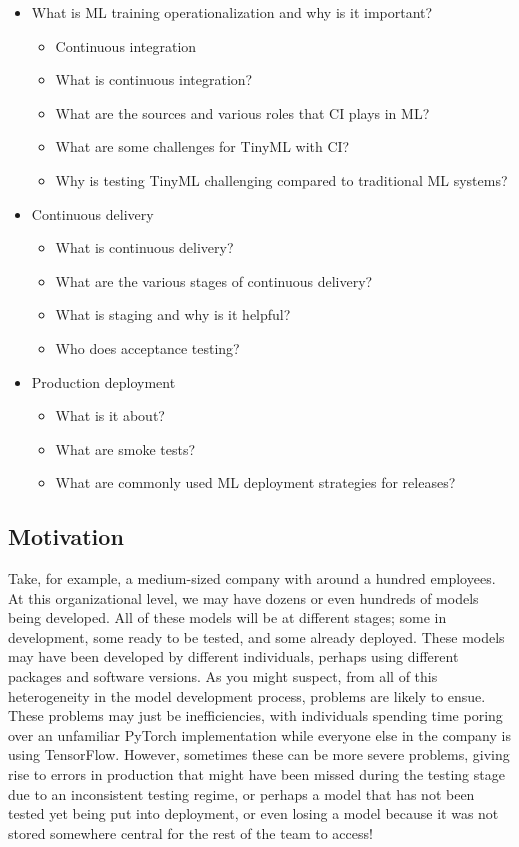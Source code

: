 {{{\begin{itemize}
  \item What is ML training operationalization and why is it important?
    \begin{itemize}
      \item Continuous integration
      \item What is continuous integration?
      \item What are the sources and various roles that CI plays in ML? 
      \item What are some challenges for TinyML with CI?
      \item Why is testing TinyML challenging compared to traditional ML systems?
    \end{itemize}    
  \item Continuous delivery
    \begin{itemize}
      \item What is continuous delivery?
      \item What are the various stages of continuous delivery?
      \item What is staging and why is it helpful?
      \item Who does acceptance testing?
    \end{itemize}    
  \item Production deployment
    \begin{itemize}
      \item What is it about?
      \item What are smoke tests?
      \item What are commonly used ML deployment strategies for releases?
    \end{itemize}    
  \end{itemize}    


\subsection{Motivation}

    Take, for example, a medium-sized company with around a hundred employees. At this organizational level, we may have dozens or even hundreds of models being developed. All of these models will be at different stages; some in development, some ready to be tested, and some already deployed. These models may have been developed by different individuals, perhaps using different packages and software versions. As you might suspect, from all of this heterogeneity in the model development process, problems are likely to ensue. These problems may just be inefficiencies, with individuals spending time poring over an unfamiliar PyTorch implementation while everyone else in the company is using TensorFlow. However, sometimes these can be more severe problems, giving rise to errors in production that might have been missed during the testing stage due to an inconsistent testing regime, or perhaps a model that has not been tested yet being put into deployment, or even losing a model because it was not stored somewhere central for the rest of the team to access!
    
}}}
